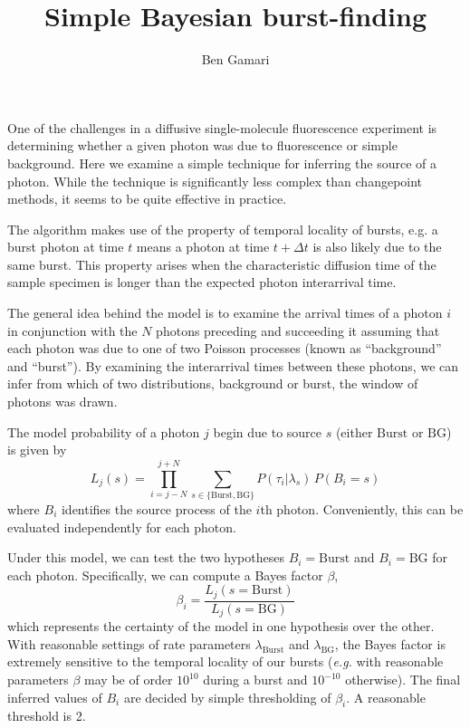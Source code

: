 \documentclass{article}
\title{Simple Bayesian burst-finding}
\author{Ben Gamari}
\newcommand{\lburst}{\ensuremath{\lambda_\mathrm{Burst}}}
\newcommand{\lbg}{\ensuremath{\lambda_\mathrm{BG}}}
\begin{document}
\maketitle

One of the challenges in a diffusive single-molecule fluorescence
experiment is determining whether a given photon was due to
fluorescence or simple background. Here we examine a simple technique
for inferring the source of a photon. While the technique is
significantly less complex than changepoint
methods\cite{watkins2005,ensign2010}, it seems to be quite effective
in practice.

The algorithm makes use of the property of temporal locality of
bursts, e.g. a burst photon at time $t$ means a photon at time $t +
\Delta t$ is also likely due to the same burst. This property arises
when the characteristic diffusion time of the sample specimen is 
longer than the expected photon interarrival time.

The general idea behind the model is to examine the arrival times of a
photon $i$ in conjunction with the $N$ photons preceding and
succeeding it assuming that each photon was due to one of two Poisson
processes (known as ``background'' and ``burst''). By examining the
interarrival times between these photons, we can infer from which of
two distributions, background or burst, the window of photons was
drawn.

The model probability of a photon $j$ begin due to source $s$ (either
$\mathrm{Burst}$ or $\mathrm{BG}$) is given by
\begin{equation}
  L_j(s) = \prod_{i=j-N}^{j+N} \sum_{s\in\{\mathrm{Burst}, \mathrm{BG}\}} P(\tau_i \vert \lambda_s)\, P(B_i = s)
\end{equation}
where $B_i$ identifies the source process of the $i$th photon.
Conveniently, this can be evaluated independently for each photon.

Under this model, we can test the two hypotheses $B_i =
\mathrm{Burst}$ and $B_i = \mathrm{BG}$ for each photon. Specifically,
we can compute a Bayes factor $\beta$,
\begin{equation}
  \beta_i = \frac{L_j(s=\mathrm{Burst})}{L_j(s=\mathrm{BG})}
\end{equation}
which represents the certainty of the model in one hypothesis over the
other. With reasonable settings of rate parameters $\lburst$ and
$\lbg$, the Bayes factor is extremely sensitive to the temporal
locality of our bursts ({\it e.g.} with reasonable parameters $\beta$
may be of order $10^{10}$ during a burst and $10^{-10}$
otherwise). The final inferred values of $B_i$ are decided by simple
thresholding of $\beta_i$. A reasonable threshold is 2.
\end{document}
